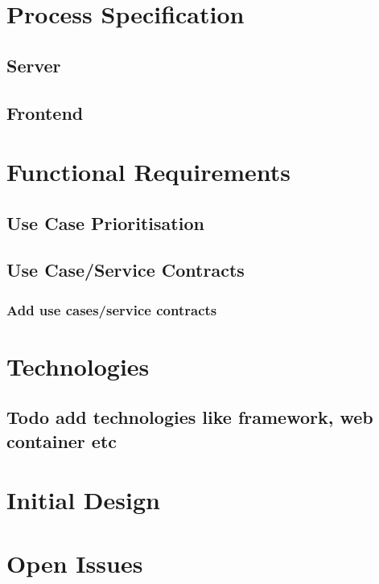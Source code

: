 \documentclass{article}
\begin{document}
\section{Process Specification}

\subsection{Server}

\subsection{Frontend}

\section{Functional Requirements}

\subsection{Use Case Prioritisation}

\subsection{Use Case/Service Contracts}

\subsubsection{Add use cases/service contracts}

\section{Technologies}

\subsection{Todo add technologies like framework, web container etc}

\section{Initial Design}

\section{Open Issues}
\end{document}
